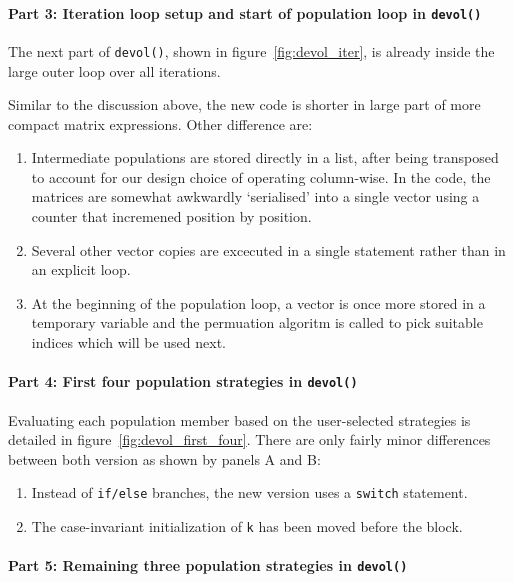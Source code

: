 \documentclass[nojss,shortnames,article]{jss}
\begin{document}
\paragraph{Part 3: Iteration loop setup and start of population loop in \texttt{devol()}} 

The next part of \verb|devol()|, shown in
figure~\ref{fig:devol_iter}, is already inside the large outer loop over all iterations.

Similar to the discussion above, the new code is shorter in large part of
more compact matrix expressions. Other difference are:
\begin{enumerate}
\item Intermediate populations are stored directly in a list, after being
  transposed to account for our design choice of operating column-wise. In
  the  code, the matrices are somewhat awkwardly `serialised'
  into a single vector using a counter that incremened position by position.
\item Several other vector copies are excecuted in a single statement rather
  than in an explicit loop.
\item At the beginning of the population loop, a vector is once more stored
  in a temporary variable and the permuation algoritm is called to pick
  suitable indices which will be used next.
\end{enumerate}

\paragraph{Part 4: First four population strategies in  \texttt{devol()}} 

Evaluating each population member based on the user-selected strategies is
detailed in figure~\ref{fig:devol_first_four}. There are only fairly minor differences
between both version as shown by panels A and B:
\begin{enumerate}
\item Instead of \verb|if/else| branches, the new version uses a
  \verb|switch| statement.
\item The case-invariant initialization of \verb|k| has been moved before the
  block.
\end{enumerate}

\paragraph{Part 5: Remaining three population strategies in  \texttt{devol()}} 
\end{document}
